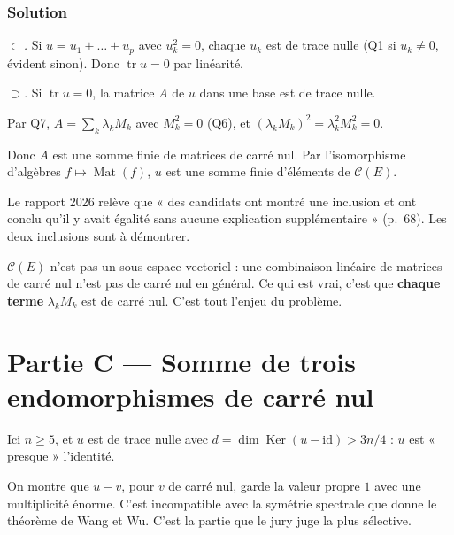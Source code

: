 \documentclass[11pt,a4paper]{article}
\newcommand{\equationajustee}[1]{%
  \sbox{\boiteequation}{$\displaystyle #1$}%
  \ifdim\wd\boiteequation>\linewidth
    \[\resizebox{\linewidth}{!}{\usebox{\boiteequation}}\]%
  \else
    \[#1\]%
  \fi}
\begin{document}
\hypertarget{solution-7}{%
\subsubsection{Solution}\label{solution-7}}

\emph{\(\subset\).} Si \(u=u_1+\dots+u_p\) avec \(u_k^2=0\), chaque \(u_k\) est de trace nulle (Q1 si \(u_k\neq0\), évident sinon). Donc \(\operatorname{tr}u=0\) par linéarité.

\emph{\(\supset\).} Si \(\operatorname{tr}u=0\), la matrice \(A\) de \(u\) dans une base est de trace nulle.

Par Q7, \(A=\sum_k\lambda_kM_k\) avec \(M_k^2=0\) (Q6), et \((\lambda_kM_k)^2=\lambda_k^2M_k^2=0\).

Donc \(A\) est une somme finie de matrices de carré nul. Par l'isomorphisme d'algèbres \(f\mapsto\operatorname{Mat}(f)\), \(u\) est une somme finie d'éléments de \(\mathcal C(E)\).
\equationajustee{\boxed{\Sigma_\infty\mathcal C(E)=\{u\in\mathcal L(E):\operatorname{tr}u=0\}.}}

\begin{piege}

Le rapport 2026 relève que « des candidats ont montré une inclusion et ont conclu qu'il y avait égalité sans aucune explication supplémentaire » (p.~68). Les deux inclusions sont à démontrer.

\end{piege}

\begin{piege}

\(\mathcal C(E)\) n'est pas un sous-espace vectoriel : une combinaison linéaire de matrices de carré nul n'est pas de carré nul en général. Ce qui est vrai, c'est que \textbf{chaque terme} \(\lambda_kM_k\) est de carré nul. C'est tout l'enjeu du problème.

\end{piege}

\hypertarget{partie-c-somme-de-trois-endomorphismes-de-carruxe9-nul}{%
\section{Partie C --- Somme de trois endomorphismes de carré nul}\label{partie-c-somme-de-trois-endomorphismes-de-carruxe9-nul}}

Ici \(n\ge5\), et \(u\) est de trace nulle avec \(d=\dim\operatorname{Ker}(u-\mathrm{id})>3n/4\) : \(u\) est « presque » l'identité.

On montre que \(u-v\), pour \(v\) de carré nul, garde la valeur propre \(1\) avec une multiplicité énorme. C'est incompatible avec la symétrie spectrale que donne le théorème de Wang et Wu. C'est la partie que le jury juge la plus sélective.
\end{document}
